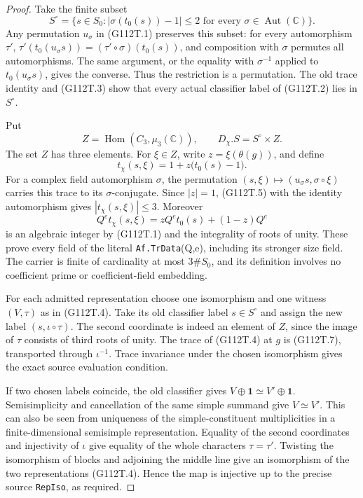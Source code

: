\begin{proof}
Take the finite subset
\[
 S^\circ=\{s\in S_0:
       |\sigma(t_0(s))-1|\le2\text{ for every }
                  \sigma\in\operatorname{Aut}(\mathbb C)\}.
                                                        \tag{G112T.5}
\]
Any permutation \(u_\sigma\) in (G112T.1) preserves this subset:
for every automorphism \(\tau'\),
\(\tau'(t_0(u_\sigma s))=(\tau'\circ\sigma)(t_0(s))\), and
composition with \(\sigma\) permutes all automorphisms.  The same
argument, or the equality with \(\sigma^{-1}\) applied to
\(t_0(u_\sigma s)\), gives the converse.  Thus the restriction is a
permutation.  The old trace identity and (G112T.3) show that every
actual classifier label of (G112T.2) lies in \(S^\circ\).

Put
\[
 Z=\operatorname{Hom}(C_3,\mu_3(\mathbb C)),\qquad
 D_\chi.S=S^\circ\times Z.
                                                        \tag{G112T.6}
\]
The set \(Z\) has three elements.  For \(\xi\in Z\), write
\(z=\xi(\theta(g))\), and define
\[
                   t_\chi(s,\xi)=1+z\bigl(t_0(s)-1\bigr).
                                                        \tag{G112T.7}
\]
For a complex field automorphism \(\sigma\), the permutation
\((s,\xi)\mapsto(u_\sigma s,\sigma\circ\xi)\) carries this trace
to its \(\sigma\)-conjugate.  Since \(|z|=1\), (G112T.5) with the
identity automorphism gives \(|t_\chi(s,\xi)|\le3\).  Moreover
\[
 Q^e t_\chi(s,\xi)=zQ^e t_0(s)+(1-z)Q^e
                                                        \tag{G112T.8}
\]
is an algebraic integer by (G112T.1) and the integrality of roots of
unity.  These prove every field of the literal
\texttt{Af.TrData}(Q,e), including its stronger size field.
The carrier is finite of cardinality at most \(3\#S_0\), and its
definition involves no coefficient prime or coefficient-field embedding.

For each admitted representation choose one isomorphism and one
witness \((V,\tau)\) as in (G112T.4).  Take its old classifier label
\(s\in S^\circ\) and assign the new label
\((s,\iota\circ\tau)\).  The second coordinate is indeed an element
of \(Z\), since the image of \(\tau\) consists of third roots of
unity.  The trace of (G112T.4) at \(g\) is (G112T.7), transported
through \(\iota^{-1}\).  Trace invariance under the chosen
isomorphism gives the exact source evaluation condition.

If two chosen labels coincide, the old classifier gives
\(V\oplus\mathbf1\simeq V'\oplus\mathbf1\).  Semisimplicity and
cancellation of the same simple summand give \(V\simeq V'\).
This can also be seen from uniqueness of the simple-constituent
multiplicities in a finite-dimensional semisimple representation.
Equality of the second coordinates and injectivity of \(\iota\)
give equality of the whole characters \(\tau=\tau'\).  Twisting
the isomorphism of blocks and adjoining the middle line give an
isomorphism of the two representations (G112T.4).  Hence the map is
injective up to the precise source \texttt{RepIso}, as required.


\end{proof}

